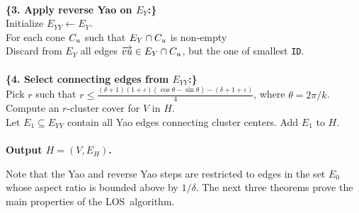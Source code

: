 \documentclass{llncs}
\newcommand{\e}{\varepsilon}
\newcommand{\id}{{\tt ID}}
\newcommand{\alg}{{\sc LOS}}
\begin{document}
\begin{table}[ht]
\begin{center}
{\begin{minipage}[h]{0.8\linewidth}
{\begin{tabbing}
\\
{\bf \{3. Apply reverse Yao on $E_Y$:\}} \\ \> Initialize $E_{YY} \leftarrow E_{Y}$. \\
   \> For each cone $C_u$ such that $E_{Y} \cap C_u$ is non-empty \\
   \> \> Discard from $E_Y$ all edges $\overrightarrow{vu} \in E_Y \cap C_u$, but the one of smallest \id.\\
\\
{\bf \{4. Select connecting edges from $E_{YY}$:\}} \\
\> Pick $r$ such that $r \le \frac{(\delta+1)(1+\e)(\cos\theta-\sin\theta)-(\delta+1+\e)}{4}$, where  $\theta  =2\pi/k$. \\
\> Compute an $r$-cluster cover for $V$ in $H$. \\\> Let $E_1 \subseteq E_{YY}$ contain all Yao edges connecting cluster centers. Add $E_1$ to $H$. \\
\\
{\bf Output $H = (V, E_H)$.}
\end{tabbing}}
\end{minipage}
}\end{center}
\caption{The \alg\ algorithm.}
\label{tab:alg}
\end{table}
Note that the Yao and reverse Yao steps are restricted to edges
in the set $E_0$ whose aspect ratio is bounded above by $1/\delta$.
The next three theorems prove the main properties of the \alg\ algorithm.
\end{document}
